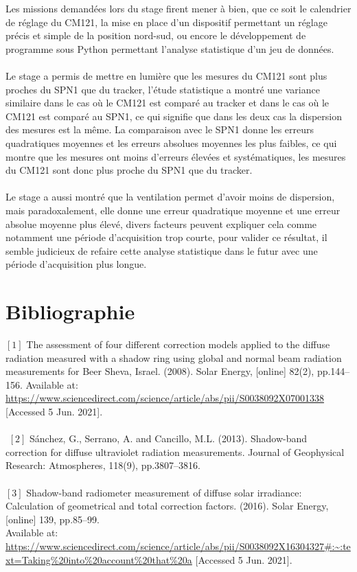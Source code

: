 \documentclass[12pt,a4paper]{article}
\begin{document}
\begin{flushleft}
Les missions demandées lors du stage firent mener à bien, que ce soit le calendrier de réglage du CM121, la mise en place d'un dispositif permettant un réglage précis et simple de la position nord-sud, ou encore le développement de programme sous Python permettant l'analyse statistique d'un jeu de données.\\
~\\
Le stage a permis de mettre en lumière que les mesures du CM121 sont plus proches du SPN1 que du tracker, l'étude statistique a montré une variance similaire dans le cas où le CM121 est comparé au tracker et dans le cas où le CM121 est comparé au SPN1, ce qui signifie que dans les deux cas la dispersion des mesures est la même. La comparaison avec le SPN1 donne les erreurs quadratiques moyennes et les erreurs absolues moyennes les plus faibles, ce qui montre que les mesures ont moins d'erreurs élevées et systématiques, les mesures du CM121 sont donc plus proche du SPN1 que du tracker.\\
~\\
Le stage a aussi montré que la ventilation permet d'avoir moins de dispersion, mais paradoxalement, elle donne une erreur quadratique moyenne et une erreur absolue moyenne plus élevé, divers facteurs peuvent expliquer cela comme notamment une période d'acquisition trop courte, pour valider ce résultat, il semble judicieux de refaire cette analyse statistique dans le futur avec une période d'acquisition plus longue.

\newpage

\section{Bibliographie}


$[1]$ The assessment of four different correction models applied to the diffuse radiation measured with a shadow ring using global and normal beam radiation measurements for Beer Sheva, Israel. (2008). Solar Energy, [online] 82(2), pp.144–156. Available at: \url{https://www.sciencedirect.com/science/article/abs/pii/S0038092X07001338} [Accessed 5 Jun. 2021].\\
~\\
‌
$[2]$ Sánchez, G., Serrano, A. and Cancillo, M.L. (2013). Shadow-band correction for diffuse ultraviolet radiation measurements. Journal of Geophysical Research: Atmospheres, 118(9), pp.3807–3816.\\

‌~\\
$[3]$ Shadow-band radiometer measurement of diffuse solar irradiance: Calculation of geometrical and total correction factors. (2016). Solar Energy, [online] 139, pp.85–99.\\ 
Available at: \url{https://www.sciencedirect.com/science/article/abs/pii/S0038092X16304327#:~:text=Taking\%20into\%20account\%20that\%20a} [Accessed 5 Jun. 2021].\\


\end{flushleft}
\end{document}
